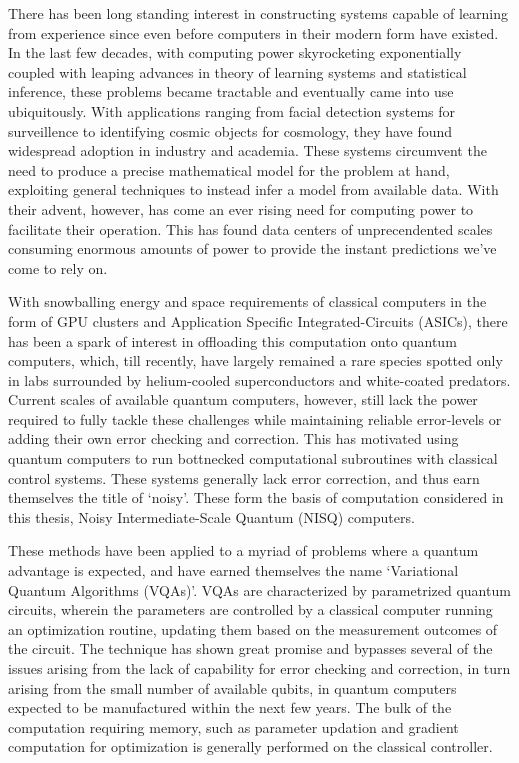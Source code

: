 
There has been long standing interest in constructing systems capable of
learning from experience since even before computers in their modern form have
existed. In the last few decades, with computing power skyrocketing
exponentially coupled with leaping advances in theory of learning systems and
statistical inference, these problems became tractable and eventually came into
use ubiquitously. With applications ranging from facial detection systems for
surveillence to identifying cosmic objects for cosmology, they have found
widespread adoption in industry and academia. These systems circumvent the need
to produce a precise mathematical model for the problem at hand, exploiting
general techniques to instead infer a model from available data. With their
advent, however, has come an ever rising need for computing power to facilitate
their operation. This has found data centers of unprecendented scales consuming
enormous amounts of power to provide the instant predictions we've come to rely
on.

With snowballing energy and space requirements of classical computers in the
form of GPU clusters and Application Specific Integrated-Circuits (ASICs), there
has been a spark of interest in offloading this computation onto quantum
computers, which, till recently, have largely remained a rare species spotted
only in labs surrounded by helium-cooled superconductors and white-coated
predators. Current scales of available quantum computers, however, still lack
the power required to fully tackle these challenges while maintaining reliable
error-levels or adding their own error checking and correction. This has
motivated using quantum computers to run bottnecked computational subroutines
with classical control systems. These systems generally lack error correction,
and thus earn themselves the title of `noisy'. These form the basis of
computation considered in this thesis, Noisy Intermediate-Scale Quantum (NISQ)
computers.

These methods have been applied to a myriad of problems where a quantum
advantage is expected, and have earned themselves the name `Variational Quantum
Algorithms (VQAs)'. VQAs are characterized by parametrized quantum circuits,
wherein the parameters are controlled by a classical computer running an
optimization routine, updating them based on the measurement outcomes of the
circuit. The technique has shown great promise and bypasses several of the
issues arising from the lack of capability for error checking and correction, in
turn arising from the small number of available qubits, in quantum computers
expected to be manufactured within the next few years. The bulk of the
computation requiring memory, such as parameter updation and gradient
computation for optimization is generally performed on the classical controller.

